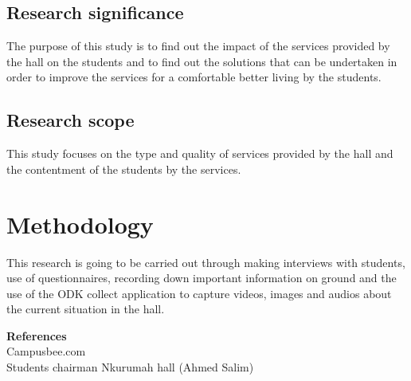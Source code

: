 \documentclass[12pt, a4paper]{article}
\begin{document}
\subsection{Research significance}
The purpose of this study is to find out the impact of the services provided by the hall on the students and to find out the solutions that can be undertaken in order to improve the services for a comfortable better living by the students.




\subsection{Research scope}
This study focuses on the type and quality of services  provided by the hall and the contentment of the students by the services.
\section{Methodology}
This research is going to be carried out through making interviews with students, use of questionnaires, recording down important information on ground and the use of  the  ODK collect application to capture videos, images and audios about the current situation in the hall.
\clearpage

\Large{\textbf{References}}\\
\normalsize Campusbee.com\\
Students chairman Nkurumah hall (Ahmed Salim)
\end{document}
